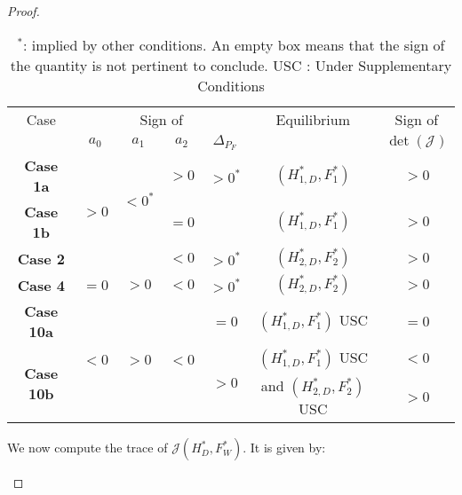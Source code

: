 \documentclass{article}
\begin{document}
\begin{proof}
\begin{itemize}
\begin{table}[!ht]
\centering
\begin{tabular}{c|c|c|c|c|c|c}
 Case & \multicolumn{4}{c|}{Sign of} &  Equilibrium & Sign of\\
 & $a_0$ & $a_1$ & $a_2$ & $\Delta_{P_F}$ & &$\det(\mathcal{J})$ \\
\hline
\textbf{Case 1a} & \multirow{3}{*}{$>0$} & \multirow{2}{*}{$< 0^*$} & $> 0$ & $>0^*$ & $(H_{1,D}^*,F_1^*)$ & $>0$ \\
\cline{4-7}
\textbf{Case 1b} &  &  & $= 0$ &  & $(H_{1,D}^*,F_1^*)$ &$>0$\\
\cline{3-7}
\textbf{Case 2} &  &  & $ < 0$ & $>0^*$ & $(H_{2,D}^*,F_2^*)$ &$>0$\\
\hline
\textbf{Case 4} & $=0$ &$ > 0$ & \multirow{1}{*}{$ < 0$}& \multirow{1}{*}{$ > 0^*$} & $(H_{2,D}^*,F_2^*)$ &$>0$ \\
\hline
\textbf{Case 10a} & \multirow{3}{*}{$ < 0$} & \multirow{3}{*}{$ > 0$} &\multirow{3}{*}{$ < 0$} &  $ = 0$& $(H_{1,D}^*,F_1^*)$ USC & $=0$ \\
\cline{5-7}
\multirow{2}{*}{\textbf{Case 10b}} &  &  & &  \multirow{2}{*}{$ > 0$}&  $(H_{1,D}^*,F_1^*)$ USC & $  < 0$\\
\cline{7-7}
 & & &  & & and $(H_{2,D}^*,F_2^*)$ USC & $ > 0$
\end{tabular}
\caption{\centering $^*$: implied by other conditions. \newline An empty box means that the sign of the quantity is not pertinent to conclude. \newline USC : Under Supplementary Conditions}
\label{table2}
\end{table}

We now compute the trace of $\mathcal{J}(H_D^*, F_W^*)$. It is given by:


\end{itemize}
\end{proof}
\end{document}
